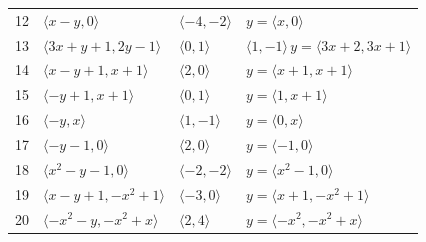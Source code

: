 \documentclass[11pt]{article}
\begin{document}
\begin{longtable}{@{}rlll@{}}
12 & $\langle x-y,0\rangle$ & $\langle -4,-2\rangle$ & $y=\langle x,0\rangle$\\
13 & $\langle 3x+y+1,2y-1\rangle$ & $\langle 0,1\rangle$ & $\langle 1,-1\rangle\,y=\langle 3x+2,3x+1\rangle$\\
14 & $\langle x-y+1,x+1\rangle$ & $\langle 2,0\rangle$ & $y=\langle x+1,x+1\rangle$\\
15 & $\langle -y+1,x+1\rangle$ & $\langle 0,1\rangle$ & $y=\langle 1,x+1\rangle$\\
16 & $\langle -y,x\rangle$ & $\langle 1,-1\rangle$ & $y=\langle 0,x\rangle$\\
17 & $\langle -y-1,0\rangle$ & $\langle 2,0\rangle$ & $y=\langle -1,0\rangle$\\
18 & $\langle x^{2}-y-1,0\rangle$ & $\langle -2,-2\rangle$ & $y=\langle x^{2}-1,0\rangle$\\
19 & $\langle x-y+1,-x^{2}+1\rangle$ & $\langle -3,0\rangle$ & $y=\langle x+1,-x^{2}+1\rangle$\\
20 & $\langle -x^{2}-y,-x^{2}+x\rangle$ & $\langle 2,4\rangle$ & $y=\langle -x^{2},-x^{2}+x\rangle$\\
\end{longtable}
\endgroup
\end{document}

